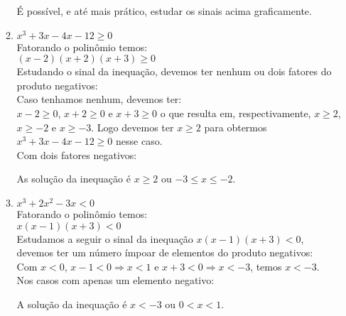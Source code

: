 \documentclass[10pt]{book}
\begin{document}
\begin{enumerate}
\begin{enumerate}
			É possível, e até mais prático, estudar os sinais acima graficamente.
		\item  %
			$x^3 + 3x - 4x - 12 \geq 0$ \\
			Fatorando o polinômio temos:\\
			$ (x-2)(x+2)(x+3) \geq 0$\\
			Estudando o sinal da inequação, devemos ter nenhum ou dois fatores do produto negativos:\\
			Caso tenhamos nenhum, devemos ter:\\
			$ x-2 \geq 0 $, $ x+2 \geq 0 $ e $x+3 \geq 0$ o que resulta em, respectivamente, $ x \geq 2 $, $ x \geq -2 $ e $x \geq -3$. Logo devemos ter $x \geq 2$ para obtermos $x^3 + 3x - 4x - 12 \geq 0$ nesse caso.\\
			Com dois fatores negativos:
			As solução da inequação é $x \geq 2$ ou $-3 \leq x \leq -2$.
		\item  %
			$x^3 + 2x^2 - 3x < 0$\\
			Fatorando o polinômio temos:\\
			$x(x - 1)(x + 3) < 0$ \\
			Estudamos a seguir o sinal da inequação $x(x - 1)(x + 3) < 0$, devemos ter um número ímpoar de elementos do produto negativos: \\
			Com $x < 0$, $x - 1 < 0 \Rightarrow x < 1$ e $x + 3 < 0 \Rightarrow x < -3$, temos $x < -3$.\\
			Nos casos com apenas um elemento negativo:
			A solução da inequação é $x < -3$ ou $0 < x < 1$.


\end{enumerate}
\end{enumerate}
\end{document}
